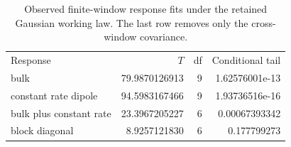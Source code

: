\begin{table}[t]\caption{Observed finite-window response fits under the retained Gaussian working law. The last row removes only the cross-window covariance.}\label{tab:fits}\begin{ruledtabular}\begin{tabular}{lrrr}Response & $T$ & df & Conditional tail\\
bulk & 79.9870126913 & 9 & 1.62576001e-13\\
constant rate dipole & 94.5983167466 & 9 & 1.93736516e-16\\
bulk plus constant rate & 23.3967205227 & 6 & 0.00067393342\\
block diagonal & 8.9257121830 & 6 & 0.177799273\\
\end{tabular}\end{ruledtabular}\end{table}
